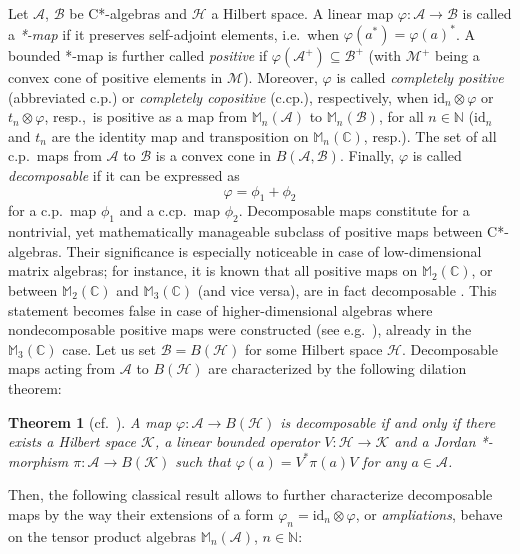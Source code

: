 \documentclass[reqno]{amsart}
\newtheorem{theorem}{Theorem}
\theoremstyle{plain}
\numberwithin{equation}{section}
\numberwithin{theorem}{section}
\numberwithin{lemma}{section}
\numberwithin{definition}{section}
\numberwithin{corollary}{section}
\numberwithin{remark}{section}
\newcommand{\naturals}{\mathbb{N}}
\newcommand{\complexes}{\mathbb{C}}
\newcommand{\id}[1]{\mathrm{id}_{#1}}
\newcommand{\hadj}{*}
\newcommand{\hilbert}{\mathcal{H}}
\newcommand{\matr}[1]{\mathbb{M}_{#1}(\complexes)}
\newcommand{\matra}[2]{\mathbb{M}_{#1}(#2)}
\newcommand{\transpose}{t}
\begin{document}
Let $\mathscr{A}$, $\mathscr{B}$ be C*-algebras and $\hilbert$ a Hilbert space. A linear map $\varphi : \mathscr{A}\to \mathscr{B}$ is called a \emph{*-map} if it preserves self-adjoint elements, i.e.~when $\varphi(a^\hadj) = \varphi(a)^\hadj$. A bounded *-map is further called \emph{positive} if $\varphi (\mathscr{A}^+) \subseteq\mathscr{B}^+$ (with $\mathscr{M}^+$ being a convex cone of positive elements in $\mathscr{M}$). Moreover, $\varphi$ is called \emph{completely positive} (abbreviated c.p.) or \emph{completely copositive} (c.cp.), respectively, when $\id{n}\otimes\varphi$ or $\transpose_n \otimes \varphi$, resp.,~is positive as a map from $\matra{n}{\mathscr{A}}$ to $\matra{n}{\mathscr{B}}$, for all $n \in \naturals$ ($\id{n}$ and $\transpose_n$ are the identity map and transposition on $\matr{n}$, resp.). The set of all c.p.~maps from $\mathscr{A}$ to $\mathscr{B}$ is a convex cone in $B(\mathscr{A},\mathscr{B})$. Finally, $\varphi$ is called \emph{decomposable} if it can be expressed as
\begin{equation}
    \varphi = \phi_1 + \phi_2
\end{equation}
for a c.p.~map $\phi_1$ and a c.cp.~map $\phi_2$. Decomposable maps constitute for a nontrivial, yet mathematically manageable subclass of positive maps between C*-algebras. Their significance is especially noticeable in case of low-dimensional matrix algebras; for instance, it is known that all positive maps on $\matr{2}$, or between $\matr{2}$ and $\matr{3}$ (and vice versa), are in fact decomposable \cite{Woronowicz1976}. This statement becomes false in case of higher-dimensional algebras where nondecomposable positive maps were constructed (see e.g.~\cite{Choi1980,Miller2015,Rutkowski2015,Chruscinski2018}), already in the $\matr{3}$ case. Let us set $\mathscr{B} = B(\hilbert)$ for some Hilbert space $\hilbert$. Decomposable maps acting from $\mathscr{A}$ to $B(\hilbert)$ are characterized by the following dilation theorem:

\begin{theorem}[cf.~\cite{Stoermer2013}]
    A map $\varphi : \mathscr{A}\to B(\hilbert)$ is decomposable if and only if there exists a Hilbert space $\mathcal{K}$, a linear bounded operator $V : \hilbert\to\mathcal{K}$ and a Jordan *-morphism $\pi : \mathscr{A} \to B(\mathcal{K})$ such that $\varphi(a) = V^\hadj \pi (a) V$ for any $a\in\mathscr{A}$.
\end{theorem}

Then, the following classical result \cite{Stormer_1982} allows to further characterize decomposable maps by the way their extensions of a form $\varphi_n = \id{n}\otimes\varphi$, or \emph{ampliations}, behave on the tensor product algebras $\matra{n}{\mathscr{A}}$, $n\in\naturals$:
\end{document}
